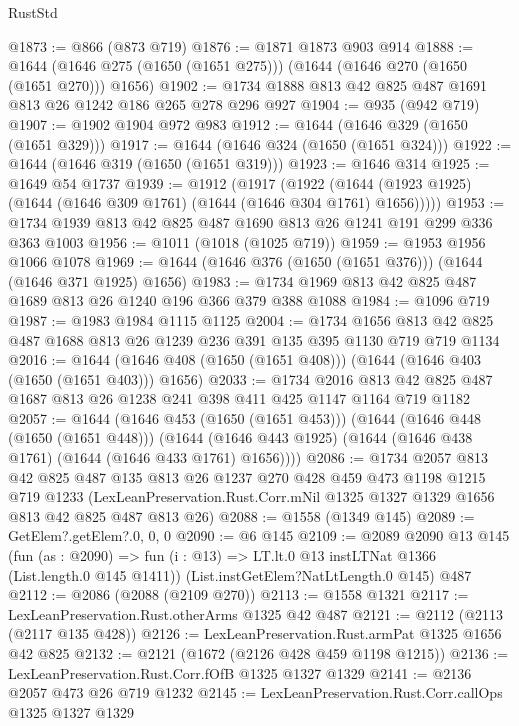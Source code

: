 \begin{lexlean}{RustStd}
\begin{coremodule}
@1873 := @866 (@873 @719)
@1876 := @1871 @1873 @903 @914
@1888 := @1644 (@1646 @275 (@1650 (@1651 @275))) (@1644 (@1646 @270 (@1650 (@1651 @270))) @1656)
@1902 := @1734 @1888 @813 @42 @825 @487 @1691 @813 @26 @1242 @186 @265 @278 @296 @927
@1904 := @935 (@942 @719)
@1907 := @1902 @1904 @972 @983
@1912 := @1644 (@1646 @329 (@1650 (@1651 @329)))
@1917 := @1644 (@1646 @324 (@1650 (@1651 @324)))
@1922 := @1644 (@1646 @319 (@1650 (@1651 @319)))
@1923 := @1646 @314
@1925 := @1649 @54 @1737
@1939 := @1912
    (@1917
      (@1922 (@1644 (@1923 @1925) (@1644 (@1646 @309 @1761) (@1644 (@1646 @304 @1761) @1656)))))
@1953 := @1734 @1939 @813 @42 @825 @487 @1690 @813 @26 @1241 @191 @299 @336 @363 @1003
@1956 := @1011 (@1018 (@1025 @719))
@1959 := @1953 @1956 @1066 @1078
@1969 := @1644 (@1646 @376 (@1650 (@1651 @376))) (@1644 (@1646 @371 @1925) @1656)
@1983 := @1734 @1969 @813 @42 @825 @487 @1689 @813 @26 @1240 @196 @366 @379 @388 @1088
@1984 := @1096 @719
@1987 := @1983 @1984 @1115 @1125
@2004 := @1734
    @1656
    @813
    @42
    @825
    @487
    @1688
    @813
    @26
    @1239
    @236
    @391
    @135
    @395
    @1130
    @719
    @719
    @1134
@2016 := @1644 (@1646 @408 (@1650 (@1651 @408))) (@1644 (@1646 @403 (@1650 (@1651 @403))) @1656)
@2033 := @1734
    @2016
    @813
    @42
    @825
    @487
    @1687
    @813
    @26
    @1238
    @241
    @398
    @411
    @425
    @1147
    @1164
    @719
    @1182
@2057 := @1644
    (@1646 @453 (@1650 (@1651 @453)))
    (@1644
      (@1646 @448 (@1650 (@1651 @448)))
      (@1644 (@1646 @443 @1925) (@1644 (@1646 @438 @1761) (@1644 (@1646 @433 @1761) @1656))))
@2086 := @1734
    @2057
    @813
    @42
    @825
    @487
    @135
    @813
    @26
    @1237
    @270
    @428
    @459
    @473
    @1198
    @1215
    @719
    @1233
    (LexLeanPreservation.Rust.Corr.mNil @1325 @1327 @1329 @1656 @813 @42 @825 @487 @813 @26)
@2088 := @1558 (@1349 @145)
@2089 := GetElem?.getElem?.{0, 0, 0}
@2090 := @6 @145
@2109 := @2089
    @2090
    @13
    @145
    (fun (as : @2090) =>
    fun (i : @13) => LT.lt.{0} @13 instLTNat @1366 (List.length.{0} @145 @1411))
    (List.instGetElem?NatLtLength.{0} @145)
    @487
@2112 := @2086 (@2088 (@2109 @270))
@2113 := @1558 @1321
@2117 := LexLeanPreservation.Rust.otherArms @1325 @42 @487
@2121 := @2112 (@2113 (@2117 @135 @428))
@2126 := LexLeanPreservation.Rust.armPat @1325 @1656 @42 @825
@2132 := @2121 (@1672 (@2126 @428 @459 @1198 @1215))
@2136 := LexLeanPreservation.Rust.Corr.fOfB @1325 @1327 @1329
@2141 := @2136 @2057 @473 @26 @719 @1232
@2145 := LexLeanPreservation.Rust.Corr.callOps @1325 @1327 @1329

\end{coremodule}
\end{lexlean}
